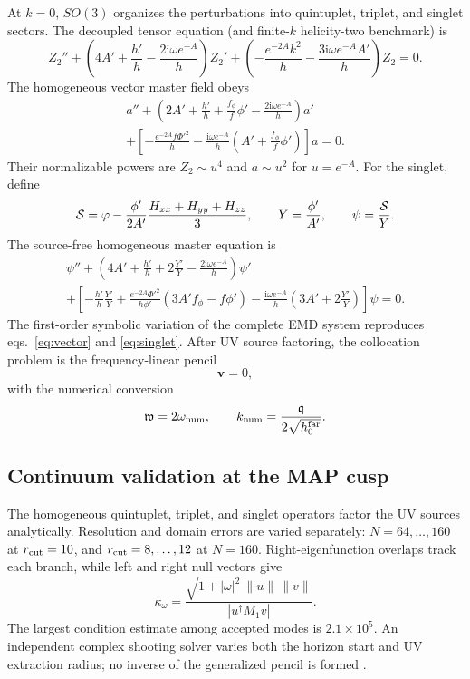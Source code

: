 \documentclass[11pt,a4paper]{article}
\newcommand{\ii}{\mathrm{i}}
\newcommand{\w}{\mathfrak{w}}
\newcommand{\q}{\mathfrak{q}}
\begin{document}
At $k=0$, $SO(3)$ organizes the perturbations into quintuplet, triplet, and
singlet sectors.  The decoupled tensor equation (and finite-$k$ helicity-two
benchmark) is
\begin{equation}
 Z_2''+\left(4A'+\frac{h'}h-\frac{2\ii\omega e^{-A}}h\right)Z_2'
 +\left(-\frac{e^{-2A}k^2}{h}-\frac{3\ii\omega e^{-A}A'}h\right)Z_2=0.
 \label{eq:tensor}
\end{equation}
The homogeneous vector master field obeys
\begin{multline}
 a''+\left(2A'+\frac{h'}h+\frac{f_\phi}{f}\phi'
 -\frac{2\ii\omega e^{-A}}h\right)a'\\
 +\left[-\frac{e^{-2A}f\Phi'^2}{h}
 -\frac{\ii\omega e^{-A}}h\left(A'+\frac{f_\phi}{f}\phi'\right)\right]a=0.
 \label{eq:vector}
\end{multline}
Their normalizable powers are $Z_2\sim u^4$ and $a\sim u^2$ for
$u=e^{-A}$.  For the singlet, define
\begin{equation}
 {\cal S}=\varphi-\frac{\phi'}{2A'}
 \frac{H_{xx}+H_{yy}+H_{zz}}{3},\qquad
 Y=\frac{\phi'}{A'},\qquad \psi=\frac{{\cal S}}Y.
 \label{eq:singlet-invariant}
\end{equation}
The source-free homogeneous master equation is
\begin{multline}
 \psi''+\left(4A'+\frac{h'}h+2\frac{Y'}Y
 -\frac{2\ii\omega e^{-A}}h\right)\psi'\\
 +\left[-\frac{h'}h\frac{Y'}Y
 +\frac{e^{-2A}\Phi'^2}{h\phi'}(3A'f_\phi-f\phi')
 -\frac{\ii\omega e^{-A}}h\left(3A'+2\frac{Y'}Y\right)\right]\psi=0.
 \label{eq:singlet}
\end{multline}
The first-order symbolic variation of the complete EMD system reproduces
eqs.~\eqref{eq:vector} and \eqref{eq:singlet}.  After UV source factoring,
the collocation problem is the frequency-linear pencil
\begin{equation}
 [M_0(k)+\omega M_1(k)]\bm v=0,
 \label{eq:pencil}
\end{equation}
with the numerical conversion
\begin{equation}
 \w=2\omega_{\rm num},\qquad
 k_{\rm num}=\frac{\q}{2\sqrt{h_0^{\rm far}}}.
 \label{eq:rescaling}
\end{equation}

\subsection{Continuum validation at the MAP cusp}

The homogeneous quintuplet, triplet, and singlet operators factor the UV
sources analytically.  Resolution and domain errors are varied separately:
$N=64,\ldots,160$ at $r_{\rm cut}=10$, and $r_{\rm cut}=8,\ldots,12$ at
$N=160$.  Right-eigenfunction overlaps track each branch, while left and
right null vectors give
\begin{equation}
 \kappa_\omega=\frac{\sqrt{1+|\omega|^2}\,\|u\|\,\|v\|}
 {|u^\dagger M_1v|}.
 \label{eq:homogeneous-conditioning}
\end{equation}
The largest condition estimate among accepted modes is $2.1\times10^5$.
An independent complex shooting solver varies both the horizon start and UV
extraction radius; no inverse of the generalized pencil is formed
\cite{Jansen:2017oag}.
\end{document}
